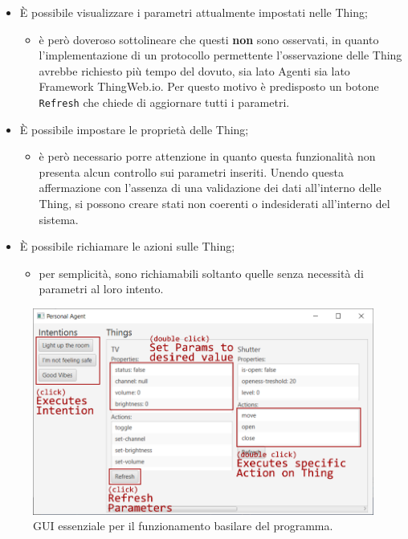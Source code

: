 \documentclass[12pt,a4paper,openright,oneside]{report}
\begin{document}
\begin{itemize}
	\item È possibile visualizzare i parametri attualmente impostati nelle Thing;
		\begin{itemize}
			\item è però doveroso sottolineare che questi \textbf{non} sono osservati, in quanto l'implementazione di un protocollo permettente l'osservazione delle Thing avrebbe richiesto più tempo del dovuto, sia lato Agenti sia lato Framework ThingWeb.io. Per questo motivo è predisposto un botone \texttt{Refresh} che chiede di aggiornare tutti i parametri.
		\end{itemize}
	
	\item È possibile impostare le proprietà delle Thing;
		\begin{itemize}
			\item è però necessario porre attenzione in quanto questa funzionalità non presenta alcun controllo sui parametri inseriti. Unendo questa affermazione con l'assenza di una validazione dei dati all'interno delle Thing, si possono creare stati non coerenti o indesiderati all'interno del sistema.
		\end{itemize}
	
	\item È possibile richiamare le azioni sulle Thing;
		\begin{itemize}
			\item per semplicità, sono richiamabili soltanto quelle senza necessità di parametri al loro intento.
		\end{itemize}
\end{itemize}

\begin{figure}[h]
	\centering
	\includegraphics[scale=0.4]{eps/gui.png}
	\caption{GUI essenziale per il funzionamento basilare del programma.}
	\label{fig:gui_implementation}
\end{figure}
\end{document}
